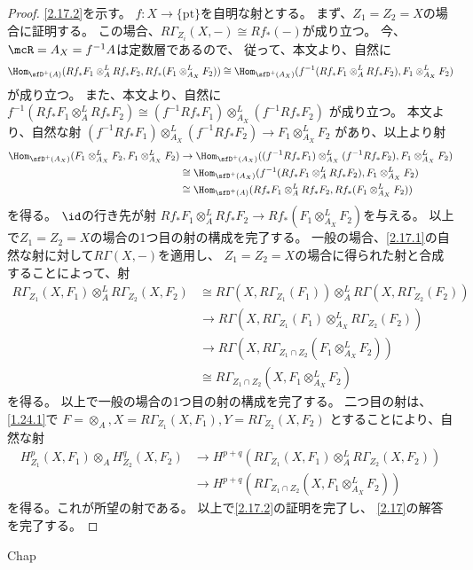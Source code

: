 \documentclass[uplatex,dvipdfmx]{jsarticle}
\begin{document}
\begin{proof}
  \ref{2.17.2}を示す。
  \(f:X\to \{\mathrm{pt}\}\)を自明な射とする。
  まず、\(Z_1=Z_2=X\)の場合に証明する。
  この場合、\(R\Gamma_{Z_i}(X,-)\cong Rf_*(-)\)が成り立つ。
  今、\(\mcR = A_X = f^{-1}A\)は定数層であるので、
  従って、本文\cite[Proposition 2.6.4 (ii)]{kashiwara2002sheaves}より、自然に
  \[
  \Hom_{\sfD^+(A)}(Rf_*F_1\otimes_A^L Rf_*F_2, Rf_*(F_1\otimes_{A_X}^L F_2))
  \cong \Hom_{\sfD^+(A_X)}(f^{-1}(Rf_*F_1\otimes_A^L Rf_*F_2),F_1\otimes_{A_X}^L F_2)
  \]
  が成り立つ。
  また、本文\cite[Proposition 2.6.5]{kashiwara2002sheaves}より、自然に
  \(f^{-1}(Rf_*F_1\otimes_A^L Rf_*F_2)\cong
  (f^{-1}Rf_*F_1)\otimes_{A_X}^L (f^{-1}Rf_*F_2)\)
  が成り立つ。
  本文\cite[射 (2.6.17)]{kashiwara2002sheaves}より、自然な射
  \((f^{-1}Rf_*F_1)\otimes_{A_X}^L (f^{-1}Rf_*F_2)\to F_1\otimes_{A_X}^LF_2\)
  があり、以上より射
  \begin{align*}
    \Hom_{\sfD^+(A_X)}(F_1\otimes_{A_X}^LF_2,F_1\otimes_{A_X}^L F_2)
    &\to \Hom_{\sfD^+(A_X)}((f^{-1}Rf_*F_1)\otimes_{A_X}^L (f^{-1}Rf_*F_2)
    ,F_1\otimes_{A_X}^L F_2) \\
    &\cong \Hom_{\sfD^+(A_X)}(f^{-1}(Rf_*F_1\otimes_A^L Rf_*F_2), F_1\otimes_{A_X}^L F_2) \\
    &\cong \Hom_{\sfD^+(A)}(Rf_*F_1\otimes_A^L Rf_*F_2, Rf_*(F_1\otimes_{A_X}^L F_2))
  \end{align*}
  を得る。
  \(\id\)の行き先が射
  \(Rf_*F_1\otimes_A^L Rf_*F_2\to Rf_*(F_1\otimes_{A_X}^L F_2)\)を与える。
  以上で\(Z_1=Z_2=X\)の場合の1つ目の射の構成を完了する。
  一般の場合、\ref{2.17.1}の自然な射に対して\(R\Gamma(X,-)\)を適用し、
  \(Z_1=Z_2=X\)の場合に得られた射と合成することによって、射
  \begin{align*}
    R\Gamma_{Z_1}(X,F_1)\otimes_A^L R\Gamma_{Z_2}(X,F_2)
    &\cong R\Gamma(X,R\Gamma_{Z_1}(F_1))\otimes_A^L R\Gamma(X,R\Gamma_{Z_2}(F_2)) \\
    &\to R\Gamma(X,R\Gamma_{Z_1}(F_1)\otimes_{A_X}^L R\Gamma_{Z_2}(F_2)) \\
    &\to R\Gamma(X,R\Gamma_{Z_1\cap Z_2}(F_1\otimes_{A_X}^L F_2)) \\
    &\cong R\Gamma_{Z_1\cap Z_2}(X,F_1\otimes_{A_X}^L F_2)
  \end{align*}
  を得る。
  以上で一般の場合の1つ目の射の構成を完了する。
  二つ目の射は、\autoref{1.24.1}で
  \(F=\otimes_A, X=R\Gamma_{Z_1}(X,F_1), Y=R\Gamma_{Z_2}(X,F_2)\)
  とすることにより、自然な射
  \begin{align*}
    H^p_{Z_1}(X,F_1)\otimes_A H^q_{Z_2}(X,F_2)
    &\to H^{p+q}(R\Gamma_{Z_1}(X,F_1)\otimes_A^L R\Gamma_{Z_2}(X,F_2)) \\
    &\to H^{p+q}(R\Gamma_{Z_1\cap Z_2}(X,F_1\otimes_{A_X}^L F_2))
  \end{align*}
  を得る。これが所望の射である。
  以上で\ref{2.17.2}の証明を完了し、
  \autoref{2.17}の解答を完了する。
\end{proof}







\ifcsname Chap\endcsname\else
\printbibliography
\end{document}
